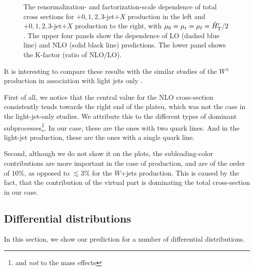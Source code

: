 \begin{figure}[t]
\begin{center}
\end{center}
\caption{The renormalization- and factorization-scale dependence of total cross
  sections for \Wbbm$+0,1,2,3$-jet$+X$ production in the left and
\Wbbp$+0,1,2,3$-jet$+X$ production to the right,
 with $\mu_0=\mu_\mathrm{r}=\mu_\mathrm{f}={\hat H}_{\mathrm T}'/2$. 
The upper four panels show the dependence of LO (dashed blue line) and
  NLO (solid black line) predictions. The lower panel shows
  the K-factor (ratio of NLO/LO).}
\label{fig_Wjets_sdep}
\end{figure}

It is interesting to compare these results with the similar studies of the $W^{\pm}$ production in association with light jets only \cite{BH:W3jPRL,BH:W4j,BH:W5j,Mangano:2016jyj}.

First of all, we notice that the central value for the NLO cross-section consistently tends towards the right end of the plateu,
which was not the case in the light-jet-only studies. We attribute this
to the different types of dominant subprocesses\footnote{and \emph{not} to the mass effects}.
In our case, these are the ones with two quark lines.
And in the light-jet production, these are the ones with a single quark line.

Second, although we do not show it on the plots,
the subleading-color contributions are more important in the case of \Wbbn{} production,
and are of the order of $10\%$, as opposed to  $\lesssim 3\%$ for the $W$+jets production.
This is caused by the fact, that the contribution of the virtual part
is dominating the total cross-section in our case.

\subsection{Differential distributions}
\label{diffxsw}

In this section, we show our prediction for a number of differential distributions.

